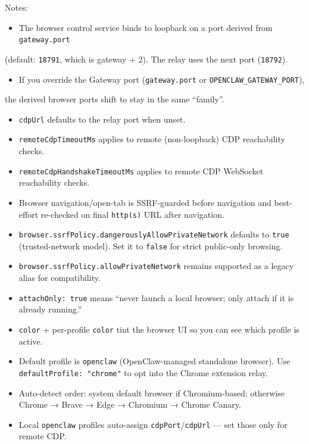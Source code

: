 Notes:

\begin{itemize}
  \item The browser control service binds to loopback on a port derived from \texttt{gateway.port}
\end{itemize}

(default: \texttt{18791}, which is gateway + 2). The relay uses the next port (\texttt{18792}).
\begin{itemize}
  \item If you override the Gateway port (\texttt{gateway.port} or \texttt{OPENCLAW\_GATEWAY\_PORT}),
\end{itemize}

the derived browser ports shift to stay in the same “family”.
\begin{itemize}
  \item \texttt{cdpUrl} defaults to the relay port when unset.
  \item \texttt{remoteCdpTimeoutMs} applies to remote (non-loopback) CDP reachability checks.
  \item \texttt{remoteCdpHandshakeTimeoutMs} applies to remote CDP WebSocket reachability checks.
  \item Browser navigation/open-tab is SSRF-guarded before navigation and best-effort re-checked on final \texttt{http(s)} URL after navigation.
  \item \texttt{browser.ssrfPolicy.dangerouslyAllowPrivateNetwork} defaults to \texttt{true} (trusted-network model). Set it to \texttt{false} for strict public-only browsing.
  \item \texttt{browser.ssrfPolicy.allowPrivateNetwork} remains supported as a legacy alias for compatibility.
  \item \texttt{attachOnly: true} means “never launch a local browser; only attach if it is already running.”
  \item \texttt{color} + per-profile \texttt{color} tint the browser UI so you can see which profile is active.
  \item Default profile is \texttt{openclaw} (OpenClaw-managed standalone browser). Use \texttt{defaultProfile: "chrome"} to opt into the Chrome extension relay.
  \item Auto-detect order: system default browser if Chromium-based; otherwise Chrome → Brave → Edge → Chromium → Chrome Canary.
  \item Local \texttt{openclaw} profiles auto-assign \texttt{cdpPort}/\texttt{cdpUrl} — set those only for remote CDP.
\end{itemize}


